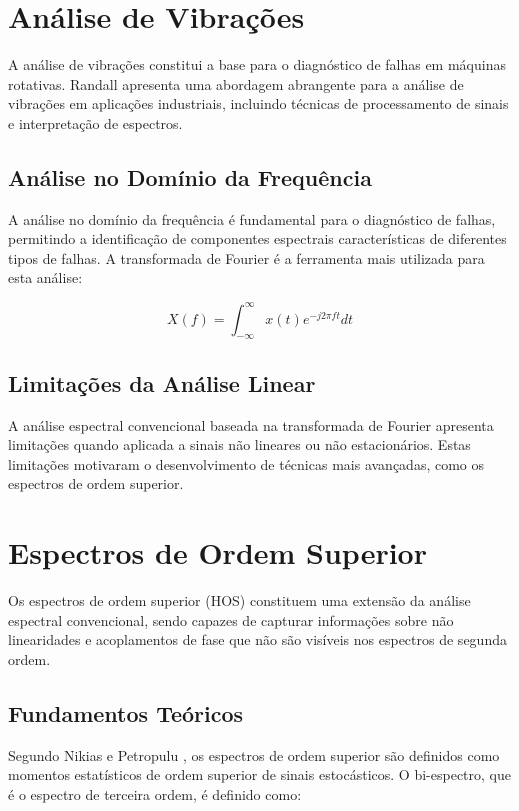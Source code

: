 \section{Análise de Vibrações}

A análise de vibrações constitui a base para o diagnóstico de falhas em máquinas rotativas. Randall \cite{randall2011} apresenta uma abordagem abrangente para a análise de vibrações em aplicações industriais, incluindo técnicas de processamento de sinais e interpretação de espectros.

\subsection{Análise no Domínio da Frequência}

A análise no domínio da frequência é fundamental para o diagnóstico de falhas, permitindo a identificação de componentes espectrais características de diferentes tipos de falhas. A transformada de Fourier é a ferramenta mais utilizada para esta análise:

\begin{equation}
X(f) = \int_{-\infty}^{\infty} x(t) e^{-j2\pi ft} dt
\end{equation}

\subsection{Limitações da Análise Linear}

A análise espectral convencional baseada na transformada de Fourier apresenta limitações quando aplicada a sinais não lineares ou não estacionários. Estas limitações motivaram o desenvolvimento de técnicas mais avançadas, como os espectros de ordem superior.

\section{Espectros de Ordem Superior}

Os espectros de ordem superior (HOS) constituem uma extensão da análise espectral convencional, sendo capazes de capturar informações sobre não linearidades e acoplamentos de fase que não são visíveis nos espectros de segunda ordem.

\subsection{Fundamentos Teóricos}

Segundo Nikias e Petropulu \cite{nikias1993}, os espectros de ordem superior são definidos como momentos estatísticos de ordem superior de sinais estocásticos. O bi-espectro, que é o espectro de terceira ordem, é definido como:

